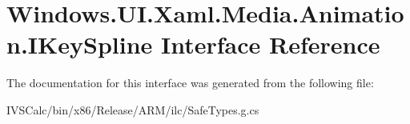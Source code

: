 \hypertarget{interface_windows_1_1_u_i_1_1_xaml_1_1_media_1_1_animation_1_1_i_key_spline}{}\section{Windows.\+U\+I.\+Xaml.\+Media.\+Animation.\+I\+Key\+Spline Interface Reference}
\label{interface_windows_1_1_u_i_1_1_xaml_1_1_media_1_1_animation_1_1_i_key_spline}


The documentation for this interface was generated from the following file\+:\begin{DoxyCompactItemize}
\item 
I\+V\+S\+Calc/bin/x86/\+Release/\+A\+R\+M/ilc/Safe\+Types.\+g.\+cs\end{DoxyCompactItemize}
